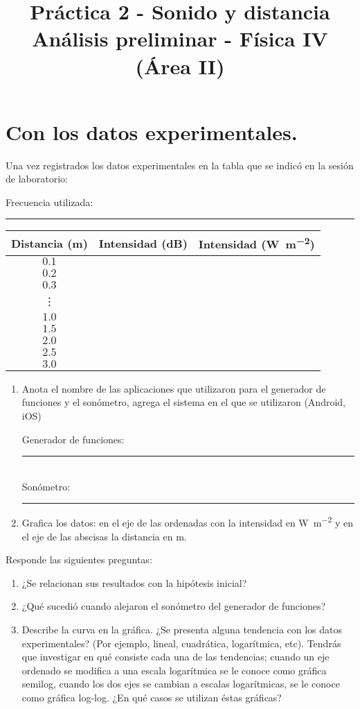 \documentclass[14pt]{extarticle}
\title{\vspace*{-2cm} Práctica 2 - Sonido y distancia \\  Análisis preliminar - Física IV (Área II) \vspace{-5ex}}
\date{}
\begin{document}
\maketitle

\section{Con los datos experimentales.}
Una vez registrados los datos experimentales en la tabla que se indicó en la sesión de laboratorio:

Frecuencia utilizada: \rule{4cm}{0.3mm}
\begin{table}[H]
\centering
\begin{tabular}{| c | c |  c |} \hline
Distancia (\unit{\meter}) & Intensidad (\unit{dB}) &  Intensidad (\unit{\watt\per\square\meter}) \\ \hline
$0.1$ & & \\ \hline    
$0.2$ & & \\ \hline    
$0.3$ & & \\ \hline    
\vdots & & \\ \hline    
$1.0$ & & \\ \hline    
$1.5$ & & \\ \hline    
$2.0$ & & \\ \hline    
$2.5$ & & \\ \hline    
$3.0$ & & \\ \hline    
\end{tabular}
\end{table}

\begin{enumerate}
\item Anota el nombre de las aplicaciones que utilizaron para el generador de funciones y el sonómetro, agrega el sistema en el que se utilizaron (Android, iOS)

Generador de funciones: \rule{5cm}{0.3mm} \\
Sonómetro: \rule{5cm}{0.3mm} 
\item Grafica los datos: en el eje de las ordenadas con la intensidad en \unit{\watt\per\square\meter} y en el eje de las abscisas la distancia en \unit{\meter}.
\end{enumerate}
Responde las siguientes preguntas:
\begin{enumerate}[resume*]
\item ¿Se relacionan sus resultados con la hipótesis inicial?
\item ¿Qué sucedió cuando alejaron el sonómetro del generador de funciones?
\item Describe la curva en la gráfica. ¿Se presenta alguna tendencia con los datos experimentales? (Por ejemplo, lineal, cuadrática, logarítmica, etc). Tendrás que investigar en qué consiste cada una de las tendencias; cuando un eje ordenado se modifica a una escala logarítmica se le conoce como gráfica semilog, cuando los dos ejes se cambian a escalas logarítmicas, se le conoce como gráfica log-log. ¿En qué casos se utilizan éstas gráficas?
\end{enumerate}
\end{document}
